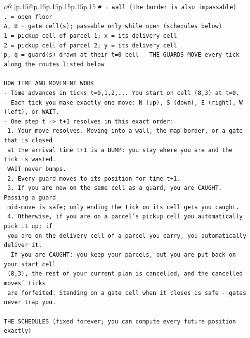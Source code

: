 \documentclass{article}
\begin{document}
{\begin{supertabular}{c@{$\;$}|p{.15\linewidth}@{}p{.15\linewidth}p{.15\linewidth}p{.15\linewidth}p{.15\linewidth}p{.15\linewidth}}
{{{\texttt{\# = wall (the border is also impassable)} \\
\texttt{. = open floor} \\
\texttt{A, B = gate cell(s); passable only while open (schedules below)} \\
\texttt{1 = pickup cell of parcel 1; x = its delivery cell} \\
\texttt{2 = pickup cell of parcel 2; y = its delivery cell} \\
\texttt{p, q = guard(s) drawn at their t=0 cell {-} THE GUARDS MOVE every tick along the routes listed below} \\
\\ 
\texttt{HOW TIME AND MOVEMENT WORK} \\
\texttt{{-} Time advances in ticks t=0,1,2,... You start on cell (8,3) at t=0.} \\
\texttt{{-} Each tick you make exactly one move: N (up), S (down), E (right), W (left), or WAIT.} \\
\texttt{{-} One step t {-}> t+1 resolves in this exact order:} \\
\texttt{  1. Your move resolves. Moving into a wall, the map border, or a gate that is closed} \\
\texttt{     at the arrival time t+1 is a BUMP: you stay where you are and the tick is wasted.} \\
\texttt{     WAIT never bumps.} \\
\texttt{  2. Every guard moves to its position for time t+1.} \\
\texttt{  3. If you are now on the same cell as a guard, you are CAUGHT. Passing a guard} \\
\texttt{     mid{-}move is safe; only ending the tick on its cell gets you caught.} \\
\texttt{  4. Otherwise, if you are on a parcel's pickup cell you automatically pick it up; if} \\
\texttt{     you are on the delivery cell of a parcel you carry, you automatically deliver it.} \\
\texttt{{-} If you are CAUGHT: you keep your parcels, but you are put back on your start cell} \\
\texttt{  (8,3), the rest of your current plan is cancelled, and the cancelled moves' ticks} \\
\texttt{  are forfeited. Standing on a gate cell when it closes is safe {-} gates never trap you.} \\
\\ 
\texttt{THE SCHEDULES (fixed forever; you can compute every future position exactly)} \\
}}}
\end{supertabular}}
\end{document}
